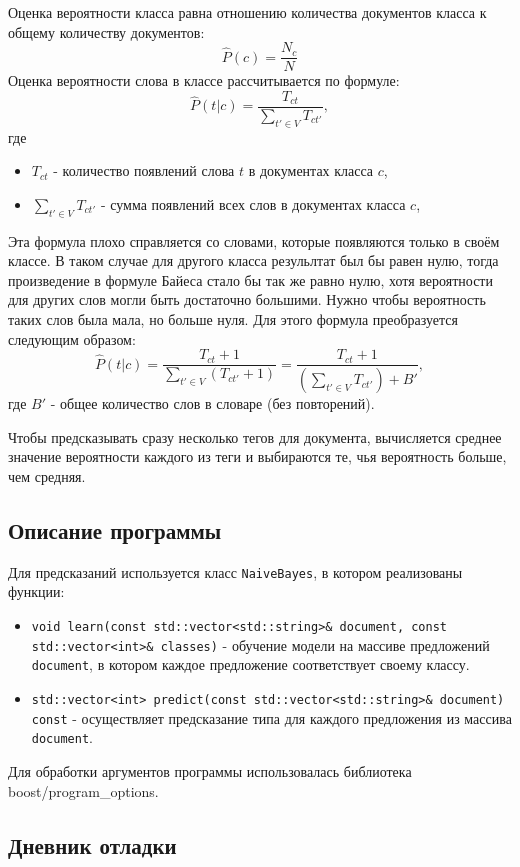 \documentclass[12pt]{article}
\begin{document}
Оценка вероятности класса равна отношению количества документов класса к общему количеству документов:
$$\widehat{P}(c) = \frac {N_c} {N}$$
Оценка вероятности слова в классе рассчитывается по формуле:
$$\widehat{P}(t | c) = \frac {T_{ct}} {\sum_{t' \in V} T_{ct'}} ,$$
где 
\begin{itemize}
    \item $T_{ct}$ - количество появлений слова $t$ в документах класса $c$,
    \item $\sum_{t' \in V} T_{ct'}$ - сумма появлений всех слов в документах класса $c$,
\end{itemize}
Эта формула плохо справляется со словами, которые появляются только в своём классе.
В таком случае для другого класса резульлтат был бы равен нулю, тогда произведение
в формуле Байеса стало бы так же равно нулю, хотя вероятности для других слов могли быть 
достаточно большими. Нужно чтобы вероятность таких слов была мала, но больше нуля.
Для этого формула преобразуется следующим образом:
$$\widehat{P}(t | c) = \frac {T_{ct} + 1} {\sum_{t' \in V} (T_{ct'} + 1)} =
\frac {T_{ct} + 1} {(\sum_{t' \in V} T_{ct'}) + B'} ,$$
где $B'$ - общее количество слов в словаре (без повторений).

Чтобы предсказывать сразу несколько тегов для документа, вычисляется среднее значение вероятности каждого из теги
и выбираются те, чья вероятность больше, чем средняя.

\subsection*{Описание программы}

Для предсказаний используется класс \texttt{NaiveBayes}, в котором реализованы функции:
\begin{itemize}
    \item \texttt{void learn(const std::vector<std::string>\& document, const std::vector<int>\& classes)} - 
          обучение модели на массиве предложений \texttt{document}, в котором каждое предложение соответствует своему классу.
    \item \texttt{std::vector<int> predict(const std::vector<std::string>\& document) const} -
          осуществляет предсказание типа для каждого предложения из массива \texttt{document}.
\end{itemize}

Для обработки аргументов программы использовалась библиотека boost/program\_options.

\subsection*{Дневник отладки}
\end{document}
